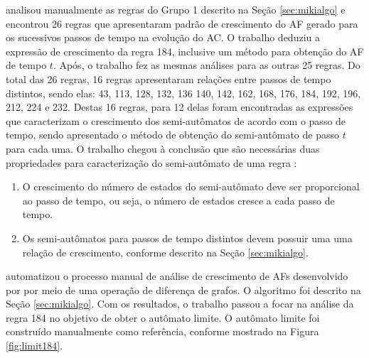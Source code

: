 \documentclass[12pt,a4paper]{article}
\begin{document}
 analisou manualmente as regras do Grupo 1 descrito
na Seção \ref{sec:mikialgo} e encontrou 26 regras que apresentaram padrão
de crescimento do AF gerado para os sucessivos passos de tempo na evolução
do AC. O trabalho deduziu a expressão de crescimento da regra 184, inclusive
um método para obtenção do AF de tempo $t$. Após, o trabalho fez as mesmas
análises para as outras 25 regras. Do total das 26 regras, 16 regras
apresentaram relações entre passos de tempo distintos, sendo elas: 43, 113,
128, 132, 136 140, 142, 162, 168, 176, 184, 192, 196, 212, 224 e 232. Destas
16 regras, para 12 delas foram encontradas as expressões que caracterizam o
crescimento dos semi-autômatos de acordo com o passo de tempo, sendo
apresentado o método de obtenção do semi-autômato de passo $t$ para cada uma.
O trabalho chegou à conclusão que são necessárias duas
propriedades para caracterização do semi-autômato de uma regra
:

\begin{enumerate}
\item O crescimento do número de estados do semi-autômato deve ser
proporcional ao passo de tempo, ou seja, o número de estados cresce
a cada passo de tempo.

\item Os semi-autômatos para passos de tempo distintos devem possuir uma
uma relação de crescimento, conforme descrito na Seção \ref{sec:mikialgo}.
\end{enumerate}

 automatizou o processo manual de análise de crescimento
de AFs desenvolvido por  por meio de uma operação
de diferença de grafos. O algoritmo foi descrito na Seção
\ref{sec:mikialgo}. Com os resultados, o trabalho passou a focar na análise
da regra 184 no objetivo de obter o autômato limite. O autômato limite
foi construído manualmente como referência, conforme mostrado na Figura
\ref{fig:limit184}.
\end{document}
